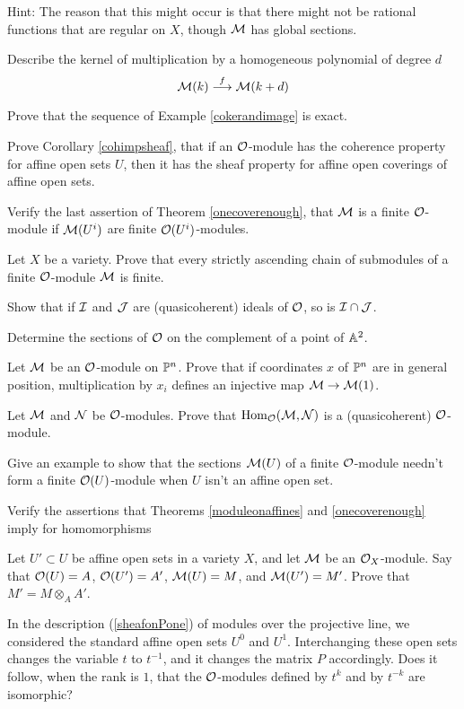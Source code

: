 \documentclass[leqno]{book}
\theoremstyle{definition}%
\numberwithin{equation}{section}
\theoremstyle{theorem} %
\begin{document}
Hint: The reason that this might occur is that there might not be
rational functions that are regular on $X$, though $\cm$ has global
sections.

\bs
Describe the kernel of multiplication by 
a homogeneous polynomial of degree $d$
$$ \cm(k) \stackrel{f}\longrightarrow \cm(k+d)$$

\bs
Prove that the sequence of Example \ref{cokerandimage} is exact.


\bs
Prove Corollary \ref{cohimpsheaf}, that if an $\co$-module has the
coherence property for affine open sets $U$, then it has the sheaf
property for affine open coverings of affine open sets.


\bs
Verify the last assertion of Theorem \ref{onecoverenough}, that $\cm$
is a finite $\co$-module if $\cm(U^i)$ are finite $\co(U^i)$-modules.

\bs Let $X$ be a variety. Prove that every strictly ascending chain of
submodules of a finite ${\co}$-module $\cm$ is finite.

Show that if $\ci$ and $\cj$ are (quasicoherent) ideals of $\co$, so is $\ci \cap \cj$.

\bs
Determine the sections of $\co$ on the complement of a point of
$\mathbb{A}^2$.


\bs
Let ${\cm}$ be an
${\co}$-module on $\mathbb{P}^n$.  Prove that if coordinates $x$ of $\mathbb{P}^n$
are in general position, multiplication by $x_i$ defines an injective
map ${\cm}\ar \cm(1)$.

\bs
Let $\cm$ and $\cn$ be $\co$-modules.  Prove that $\Hom_\co(\cm,\cn)$
is a (quasicoherent) ${\co}$-module.


\bs Give an example to show that the sections ${\cm}(U)$ of a finite
${\co}$-module needn't form a finite ${\co}(U)$-module when $U$ isn't
an affine open set.


\bs
Verify the assertions that Theorems \ref{moduleonaffines} and
\ref{onecoverenough} imply for homomorphisms



\bs   Let $U'\subset U$ be affine open sets in a
variety $X$, and let ${\cm}$ be an ${\co}_X$-module.  Say that ${\co}(U)=
A$, ${\co}(U')=A'$, ${\cm}(U) = M$, and ${\cm}(U') = M'$.  Prove that $M' =
M \otimes_AA'$.

\bs
  In the description (\ref{sheafonPone}) of modules over the
projective line, we considered the standard affine open sets $U^0$ and
$U^1$.  Interchanging these open sets changes the variable $t$ to
$t^{-1}$, and it changes the matrix $P$ accordingly.  Does it follow,
when the rank is $1$, that the ${\co}$-modules defined by $t^k$ and by
$t^{-k}$ are isomorphic?
\end{document}

